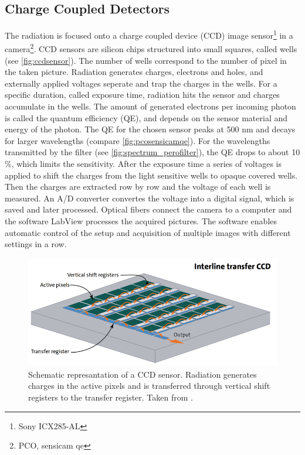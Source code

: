 \subsection{Charge Coupled Detectors}
The radiation is focused onto a charge coupled device (CCD) image sensor\footnote{Sony ICX285-AL} in a camera\footnote{PCO, sensicam qe}. CCD sensors are silicon chips structured into small squares, called wells \cite{SchnellCCD1993}(see \autoref{fig:ccdsensor}). The number of wells correspond to the number of pixel in the taken picture. Radiation generates charges, electrons and holes, and externally applied voltages seperate and trap the charges in the wells. For a specific duration, called exposure time, radiation hits the sensor and charges accumulate in the wells. The amount of generated electrons per incoming photon is called the quantum efficiency (QE), and depends on the sensor material and energy of the photon. The QE for the chosen sensor peaks at 500 nm and decays for larger wavelengths (compare \autoref{fig:pcosensicamqe}). For the wavelengths transmitted by the filter (see \autoref{fig:spectrum_perofilter}), the QE drops to about 10 \%, which limits the sensitivity. After the exposure time a series of voltages is applied to shift the charges from the light sensitive wells to opaque covered wells. Then the charges are extracted row by row and the voltage of each well is measured. An A/D converter convertes the voltage into a digital signal, which is saved and later processed. Optical fibers connect the camera to a computer and the software LabView processes the acquired pictures. The software enables automatic control of the setup and acquisition of multiple images with different settings in a row.
\begin{figure}
	\centering
	\includegraphics[width=\linewidth]{Images/ExperimentalSetup/ccd-sensor-interline-transfer-en}
	\caption{Schematic represantation of a CCD sensor. Radiation generates charges in the active pixels and is transferred through vertical shift registers to the transfer register. Taken from \cite{StemmerCCD}.}
	\label{fig:ccdsensor}
\end{figure}

